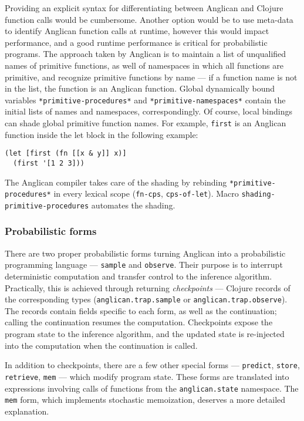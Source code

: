\documentclass[preprint]{sigplanconf}
\begin{document}
Providing an explicit syntax for differentiating between
Anglican and Clojure function calls would be cumbersome. Another
option would be to use meta-data to identify Anglican function
calls at runtime, however this would impact performance, and
a good runtime performance is critical for probabilistic
programs. The approach taken by Anglican is to maintain a list
of unqualified names of primitive functions, as well of
namespaces in which all functions are primitive, and recognize
primitive functions by name --- if a function name is not in the
list, the function is an Anglican function. Global dynamically
bound variables \texttt{*primitive-procedures*} and
\texttt{*primitive-namespaces*} contain the initial lists of
names and namespaces, correspondingly. Of course, local bindings
can shade global primitive function names. For example,
\texttt{first} is an Anglican function inside the let block in the
following example:
\begin{lstlisting}[style=default]
(let [first (fn [[x & y]] x)]
  (first '[1 2 3]))
\end{lstlisting}
The Anglican compiler takes care of the shading by rebinding
\texttt{*primitive-procedures*} in every lexical scope
(\texttt{fn-cps}, \texttt{cps-of-let}). Macro
\texttt{shading-primitive-procedures} automates the shading.

\subsubsection{Probabilistic forms}

There are two proper probabilistic forms turning Anglican into a
probabilistic programming language --- \texttt{sample} and
\texttt{observe}. Their purpose is to interrupt deterministic
computation and transfer control to the inference algorithm.
Practically, this is achieved through returning
\textit{checkpoints} --- Clojure records of the corresponding
types (\texttt{anglican.trap.sample} or
\texttt{anglican.trap.observe}). The records contain fields
specific to each form, as well as the continuation; calling the
continuation resumes the computation. Checkpoints expose the
program state to the inference algorithm, and the updated state
is re-injected into the computation when the continuation is
called. 

In addition to checkpoints, there are a few other special forms
--- \texttt{predict}, \texttt{store}, \texttt{retrieve},
\texttt{mem} --- which modify program state. These forms are
translated into expressions involving calls of functions from the
\texttt{anglican.state} namespace. The \texttt{mem} form, which
implements stochastic memoization, deserves a more detailed
explanation.
\end{document}
